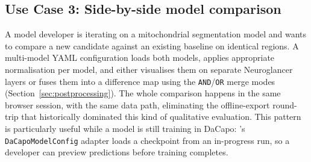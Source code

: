 \subsection*{Use Case 3: Side-by-side model comparison}

A model developer is iterating on a mitochondrial segmentation model and wants to compare a new candidate against an existing baseline on identical regions. A multi-model YAML configuration loads both models, applies appropriate normalisation per model, and either visualises them on separate Neuroglancer layers or fuses them into a difference map using the \texttt{AND}/\texttt{OR} merge modes (Section~\ref{sec:postprocessing}). The whole comparison happens in the same browser session, with the same data path, eliminating the offline-export round-trip that historically dominated this kind of qualitative evaluation. This pattern is particularly useful while a model is still training in DaCapo: \cellmapflow{}'s \texttt{DaCapoModelConfig} adapter loads a checkpoint from an in-progress run, so a developer can preview predictions before training completes.
